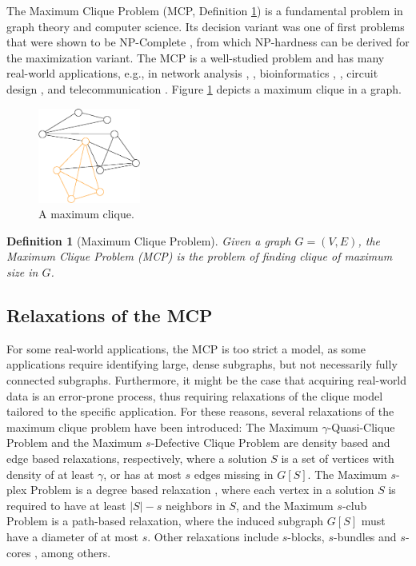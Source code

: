 \documentclass[draft,final]{vutinfth} %
\newtheorem{definition}{Definition}[section]
\begin{document}
The Maximum Clique Problem (MCP, Definition \ref{def:mcp}) is a fundamental problem in graph theory and computer science. Its decision variant was one of first problems that were shown to be NP-Complete \cite{Karp1972}, from which NP-hardness can be derived for the maximization variant. The MCP is a well-studied problem and has many real-world applications, e.g., in network analysis \cite{Fortunato09}, \cite{Palla2005}, bioinformatics \cite{Depolli2013}, \cite{BUTENKO20061}, circuit design \cite{LeckyMA89}, and telecommunication \cite{DouikSAA14}. 
Figure \ref{fig:maxclique} depicts a maximum clique in a graph. 
\begin{figure}
    \centering
    \includegraphics[width=0.3\textwidth]{graphics/graph1-clique.eps}
    \caption{A maximum clique.}
    \label{fig:maxclique}
\end{figure}

\begin{definition}[Maximum Clique Problem]
	\label{def:mcp}
	Given a graph $G = (V,E)$, the Maximum Clique Problem (MCP) is the problem of finding clique of maximum size in $G$. 
\end{definition}

\subsection{Relaxations of the MCP}

For some real-world applications, the MCP is too strict a model, as some applications require identifying large, dense subgraphs, but not necessarily fully connected subgraphs. 
Furthermore, it might be the case that acquiring real-world data is an error-prone process, thus requiring relaxations of the clique model tailored to the specific application. 
For these reasons, several relaxations of the maximum clique problem have been introduced: The Maximum $\gamma$-Quasi-Clique Problem \cite{Abello2002} and the Maximum $s$-Defective Clique Problem \cite{Yu2006} are density based and edge based relaxations, respectively, where a solution $S$ is a set of vertices with density of at least $\gamma$, or has at most $s$ edges missing in $G[S]$. 
The Maximum $s$-plex Problem is a degree based relaxation \cite{Seidman1978}, where each vertex in a solution $S$ is required to have at least $|S| - s$ neighbors in $S$, and the Maximum $s$-club Problem \cite{Mokken1979} is a path-based relaxation, where the induced subgraph $G[S]$ must have a diameter of at most $s$. Other relaxations include $s$-blocks, $s$-bundles and $s$-cores \cite{Gschwind2015}, among others. 
\end{document}
